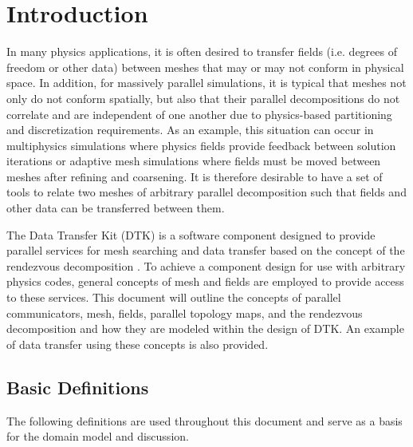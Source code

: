 \documentclass[letterpaper,12pt]{article}
\begin{document}
\section{Introduction}\label{sec:intro}
In many physics applications, it is often desired to transfer fields
(i.e. degrees of freedom or other data) between meshes that may or may
not conform in physical space. In addition, for massively parallel
simulations, it is typical that meshes not only do not conform
spatially, but also that their parallel decompositions do not
correlate and are independent of one another due to physics-based
partitioning and discretization requirements. As an example, this
situation can occur in multiphysics simulations where physics fields
provide feedback between solution iterations or adaptive mesh
simulations where fields must be moved between meshes after refining
and coarsening. It is therefore desirable to have a set of tools to
relate two meshes of arbitrary parallel decomposition such that fields
and other data can be transferred between them.

The Data Transfer Kit (DTK) is a software component designed to
provide parallel services for mesh searching and data transfer based
on the concept of the rendezvous decomposition
\cite{Plimpton_2004}. To achieve a component design for use with
arbitrary physics codes, general concepts of mesh and fields are
employed to provide access to these services. This document will
outline the concepts of parallel communicators, mesh, fields, parallel
topology maps, and the rendezvous decomposition and how they are
modeled within the design of DTK. An example of data transfer using
these concepts is also provided.

\subsection{Basic Definitions}\label{subsec:basic_defs}

The following definitions are used throughout this document and serve
as a basis for the domain model and discussion.
\end{document}
